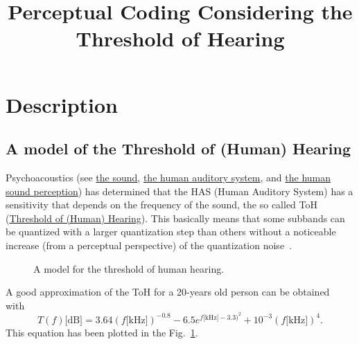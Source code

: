 
\title{Perceptual Coding Considering the Threshold of Hearing}

\maketitle

\section{Description}

\subsection{A model of the Threshold of (Human) Hearing}

Psychoacoustics (see
\href{https://vicente-gonzalez-ruiz.github.io/the_sound/}{the sound},
\href{https://vicente-gonzalez-ruiz.github.io/human_auditory_system/}{the
  human auditory system}, and
\href{https://vicente-gonzalez-ruiz.github.io/human_sound_perception/}{the
  human sound perception}) has determined that the HAS (Human Auditory
System) has a sensitivity that depends on the frequency of the sound,
the so called ToH
(\href{https://en.wikipedia.org/wiki/Absolute_threshold_of_hearing}{Threshold
  of (Human) Hearing}). This basically means that some subbands can be
quantized with a larger quantization step than others without a
noticeable increase (from a perceptual perspective) of the
quantization noise~\cite{sayood2017introduction}.

\begin{figure}
  \centering
  \caption{A model for the threshold of human hearing.}
  \label{fig:ToHH}
\end{figure}

A good approximation of the ToH for a 20-years old person can be
obtained with~\cite{bosi2003intro}
\begin{equation}
  T(f)\text{[dB]} = 3.64(f\text{[kHz]})^{-0.8} - 6.5e^{f\text{[kHz]}-3.3)^2} + 10^{-3}(f\text{[kHz]})^4.
  \label{eq:ToHH}
\end{equation}
This equation has been plotted in the Fig.~\ref{fig:ToHH}.

